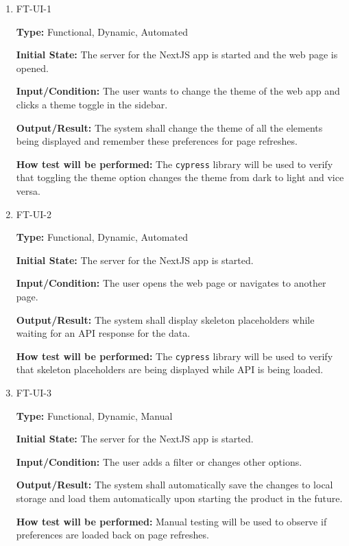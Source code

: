 \documentclass[12pt, titlepage]{article}
\begin{document}
\begin{enumerate}
\item{FT-UI-1}

\textbf{Type:} Functional, Dynamic, Automated
                    
\textbf{Initial State:} The server for the NextJS app is started and the web page is opened.
                    
\textbf{Input/Condition:} The user wants to change the theme of the web app and clicks a theme toggle in the sidebar.
                    
\textbf{Output/Result:} The system shall change the theme of all the elements being displayed and remember these preferences for page refreshes.
                    
\textbf{How test will be performed:} The \texttt{cypress} library will be used to verify that toggling the theme option changes the theme from dark to light and vice versa.

\item{FT-UI-2}

\textbf{Type:} Functional, Dynamic, Automated
                    
\textbf{Initial State:} The server for the NextJS app is started.
                    
\textbf{Input/Condition:} The user opens the web page or navigates to another page.
                    
\textbf{Output/Result:} The system shall display skeleton placeholders while waiting for an API response for the data.
                    
\textbf{How test will be performed:} The \texttt{cypress} library will be used to verify that skeleton placeholders are being displayed while API is being loaded.

\item{FT-UI-3}

\textbf{Type:} Functional, Dynamic, Manual
                    
\textbf{Initial State:} The server for the NextJS app is started.
                    
\textbf{Input/Condition:} The user adds a filter or changes other options.
                    
\textbf{Output/Result:} The system shall automatically save the changes to local storage and load them automatically upon starting the product in the future.
                    
\textbf{How test will be performed:} Manual testing will be used to observe if preferences are loaded back on page refreshes.
\end{enumerate}
\end{document}
